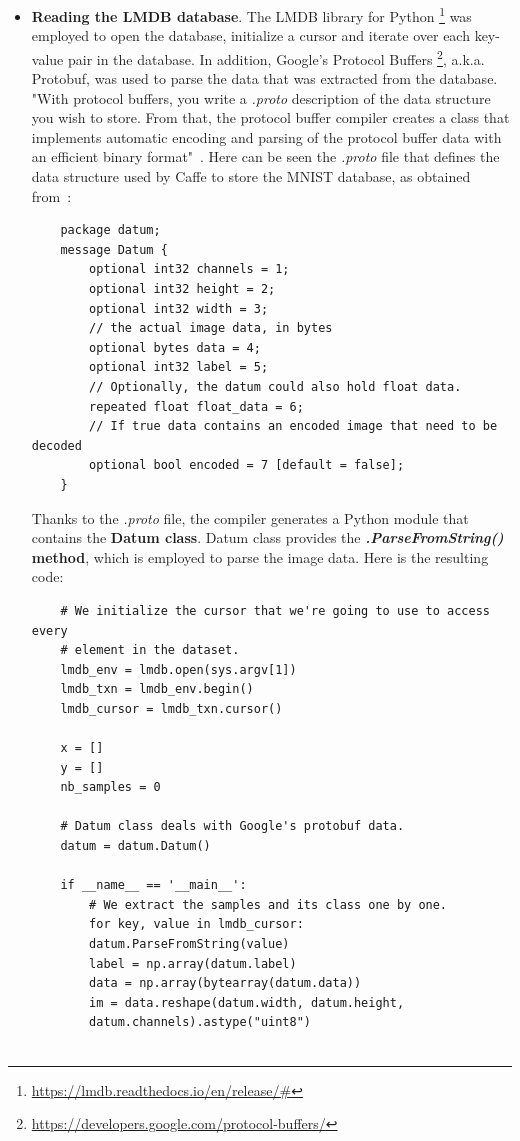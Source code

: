 \begin{itemize}
	\item \textbf{Reading the LMDB database}. The LMDB library for Python \footnote{\url{https://lmdb.readthedocs.io/en/release/\#}} was employed to open the database, initialize a cursor and iterate over each key-value pair in the database. In addition, Google's Protocol Buffers \footnote{\url{https://developers.google.com/protocol-buffers/}}, a.k.a. Protobuf, was used to parse the data that was extracted from the database. "With protocol buffers, you write a \textit{.proto} description of the data structure you wish to store. From that, the protocol buffer compiler creates a class that implements automatic encoding and parsing of the protocol buffer data with an efficient binary format"~\cite{protobuf}. Here can be seen the \textit{.proto} file that defines the data structure used by Caffe to store the MNIST database, as obtained from~\cite{lmdb_tutorial}: 
	\begin{lstlisting}
	package datum;
	message Datum {
		optional int32 channels = 1;
		optional int32 height = 2;
		optional int32 width = 3;
		// the actual image data, in bytes
		optional bytes data = 4;
		optional int32 label = 5;
		// Optionally, the datum could also hold float data.
		repeated float float_data = 6;
		// If true data contains an encoded image that need to be decoded
		optional bool encoded = 7 [default = false];
	}
	\end{lstlisting}
	
	Thanks to the \textit{.proto} file, the compiler generates a Python module that contains the \textbf{Datum class}. Datum class provides the \textbf{\textit{.ParseFromString()} method}, which is employed to parse the image data. Here is the resulting code:
	\begin{lstlisting}
	# We initialize the cursor that we're going to use to access every
	# element in the dataset.
	lmdb_env = lmdb.open(sys.argv[1])
	lmdb_txn = lmdb_env.begin()
	lmdb_cursor = lmdb_txn.cursor()
	
	x = []
	y = []
	nb_samples = 0
	
	# Datum class deals with Google's protobuf data.
	datum = datum.Datum()
	
	if __name__ == '__main__':
		# We extract the samples and its class one by one.
		for key, value in lmdb_cursor:
		datum.ParseFromString(value)
		label = np.array(datum.label)
		data = np.array(bytearray(datum.data))
		im = data.reshape(datum.width, datum.height,
		datum.channels).astype("uint8")
		

\end{lstlisting}
\end{itemize}
